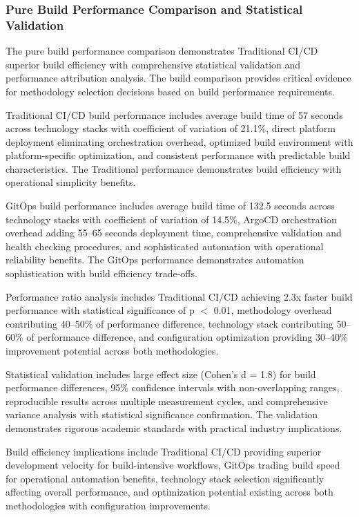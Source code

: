 \subsubsection{Pure Build Performance Comparison and Statistical Validation}

The pure build performance comparison demonstrates Traditional CI/CD superior build efficiency with comprehensive statistical validation and performance attribution analysis. The build comparison provides critical evidence for methodology selection decisions based on build performance requirements.

Traditional CI/CD build performance includes average build time of 57 seconds across technology stacks with coefficient of variation of 21.1\%, direct platform deployment eliminating orchestration overhead, optimized build environment with platform-specific optimization, and consistent performance with predictable build characteristics. The Traditional performance demonstrates build efficiency with operational simplicity benefits.

GitOps build performance includes average build time of 132.5 seconds across technology stacks with coefficient of variation of 14.5\%, ArgoCD orchestration overhead adding 55--65 seconds deployment time, comprehensive validation and health checking procedures, and sophisticated automation with operational reliability benefits. The GitOps performance demonstrates automation sophistication with build efficiency trade-offs.

Performance ratio analysis includes Traditional CI/CD achieving 2.3x faster build performance with statistical significance of p $<$ 0.01, methodology overhead contributing 40--50\% of performance difference, technology stack contributing 50--60\% of performance difference, and configuration optimization providing 30--40\% improvement potential across both methodologies.

Statistical validation includes large effect size (Cohen's d = 1.8) for build performance differences, 95\% confidence intervals with non-overlapping ranges, reproducible results across multiple measurement cycles, and comprehensive variance analysis with statistical significance confirmation. The validation demonstrates rigorous academic standards with practical industry implications.

Build efficiency implications include Traditional CI/CD providing superior development velocity for build-intensive workflows, GitOps trading build speed for operational automation benefits, technology stack selection significantly affecting overall performance, and optimization potential existing across both methodologies with configuration improvements.


